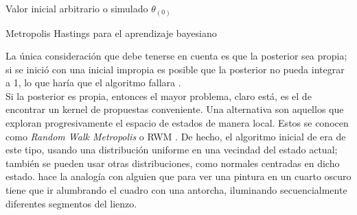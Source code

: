 \begin{algorithm}
\DontPrintSemicolon



Valor inicial arbitrario o simulado $\theta_{(0)}$\;

\caption{Metropolis Hastings para el aprendizaje bayesiano \label{alg:MH}}
\end{algorithm}

La única consideración que debe tenerse en cuenta es que la posterior sea propia; si se inició con una inicial impropia es posible que la posterior no pueda integrar a 1, lo que haría que el algoritmo fallara \parencite{RobertCasella10}.\\

Si la posterior es propia, entonces el mayor problema, claro está, es el de encontrar un kernel de propuestas conveniente. Una alternativa son aquellos que exploran progresivamente el espacio de estados de manera local. Estos se conocen como \textit{Random Walk Metropolis} o RWM \parencite{RobertCasella10}. De hecho, el algoritmo inicial de \textcite{Metropolis53} era de este tipo, usando una distribución uniforme en una vecindad del estado actual; también se pueden usar otras distribuciones, como normales centradas en dicho estado. \textcite{Robert15} hace la analogía con alguien que para ver una pintura en un cuarto oscuro tiene que ir alumbrando el cuadro con una antorcha, iluminando secuencialmente diferentes segmentos del lienzo.\\

